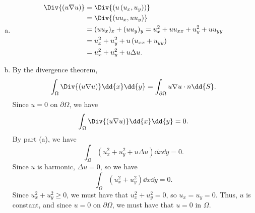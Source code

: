 \documentclass[plain]{pset}
\begin{document}
\begin{solution}
    \leavevmode
    \begin{enumerate}[(a)]
        \item \leavevmode
              \begin{align*}
                  \Div{(u\nabla u)} & = \Div{\left(u\left(u_x, u_y\right)\right)}               \\
                                    & = \Div{\left(uu_x, uu_y\right)}                           \\
                                    & = (uu_x)_x + (uu_y)_y = u_x^2 + uu_{xx} + u_y^2 + uu_{yy} \\
                                    & = u_x^2 + u_y^2 + u \left(u_{xx} + u_{yy}\right)          \\
                                    & = u_x^2 + u_y^2 + u\Delta u.
              \end{align*}
        \item By the divergence theorem,
              \[\int_\Omega \Div{(u\nabla u)} \dd{x} \dd{y} = \int_{\partial \Omega} u\nabla u \cdot n \dd{S}.\]
              Since \(u = 0\) on \(\partial \Omega\), we have
              \[\int_\Omega \Div{(u\nabla u)} \dd{x} \dd{y} = 0.\]
              By part (a), we have
              \[\int_\Omega \left(u_x^2 + u_y^2 + u\Delta u\right) \dd{x} \dd{y} = 0.\]
              Since \(u\) is harmonic, \(\Delta u = 0\), so we have
              \[\int_\Omega \left(u_x^2 + u_y^2\right) \dd{x} \dd{y} = 0.\]
              Since \(u_x^2 + u_y^2 \geq 0\), we must have that \(u_x^2 + u_y^2 = 0\), so \(u_x = u_y = 0\). Thus, \(u\) is constant, and since \(u = 0\) on \(\partial \Omega\), we must have that \(u = 0\) in \(\Omega\).

    \end{enumerate}
\end{solution}
\end{document}
